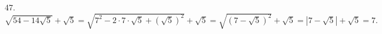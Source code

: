 47. $\sqrt{54-14\sqrt{5}}+\sqrt{5}=\sqrt{7^2-2\cdot7\cdot\sqrt{5}+(\sqrt{5})^2}+\sqrt{5}=\sqrt{(7-\sqrt{5})^2}+\sqrt{5}=|7-\sqrt{5}|+\sqrt{5}=7.$\\
